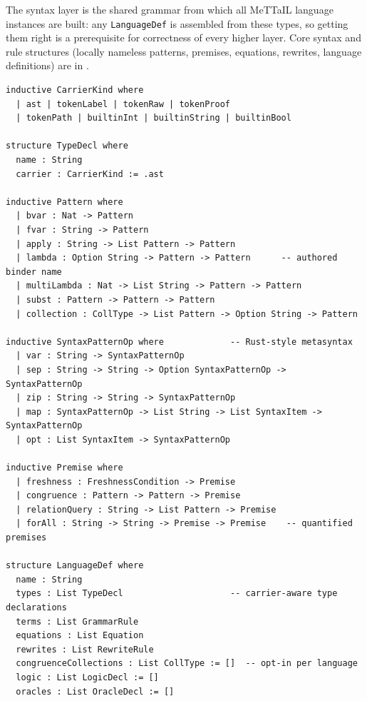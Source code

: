 \documentclass[11pt]{article}
\newcommand{\code}[1]{\texttt{#1}}
\newcommand{\codepath}[1]{\path{#1}}
\begin{document}
The syntax layer is the shared grammar from which all MeTTaIL language instances
are built: any \code{LanguageDef} is assembled from these types, so getting them
right is a prerequisite for correctness of every higher layer.
Core syntax and rule structures (locally nameless patterns, premises, equations,
rewrites, language definitions) are in
\codepath{Mettapedia/OSLF/MeTTaIL/Syntax.lean}.

\begin{lstlisting}[language={},caption={Core MeTTaIL structures (excerpt)}]
inductive CarrierKind where
  | ast | tokenLabel | tokenRaw | tokenProof
  | tokenPath | builtinInt | builtinString | builtinBool

structure TypeDecl where
  name : String
  carrier : CarrierKind := .ast

inductive Pattern where
  | bvar : Nat -> Pattern
  | fvar : String -> Pattern
  | apply : String -> List Pattern -> Pattern
  | lambda : Option String -> Pattern -> Pattern      -- authored binder name
  | multiLambda : Nat -> List String -> Pattern -> Pattern
  | subst : Pattern -> Pattern -> Pattern
  | collection : CollType -> List Pattern -> Option String -> Pattern

inductive SyntaxPatternOp where             -- Rust-style metasyntax
  | var : String -> SyntaxPatternOp
  | sep : String -> String -> Option SyntaxPatternOp -> SyntaxPatternOp
  | zip : String -> String -> SyntaxPatternOp
  | map : SyntaxPatternOp -> List String -> List SyntaxItem -> SyntaxPatternOp
  | opt : List SyntaxItem -> SyntaxPatternOp

inductive Premise where
  | freshness : FreshnessCondition -> Premise
  | congruence : Pattern -> Pattern -> Premise
  | relationQuery : String -> List Pattern -> Premise
  | forAll : String -> String -> Premise -> Premise    -- quantified premises

structure LanguageDef where
  name : String
  types : List TypeDecl                     -- carrier-aware type declarations
  terms : List GrammarRule
  equations : List Equation
  rewrites : List RewriteRule
  congruenceCollections : List CollType := []  -- opt-in per language
  logic : List LogicDecl := []
  oracles : List OracleDecl := []
\end{lstlisting}
\end{document}
